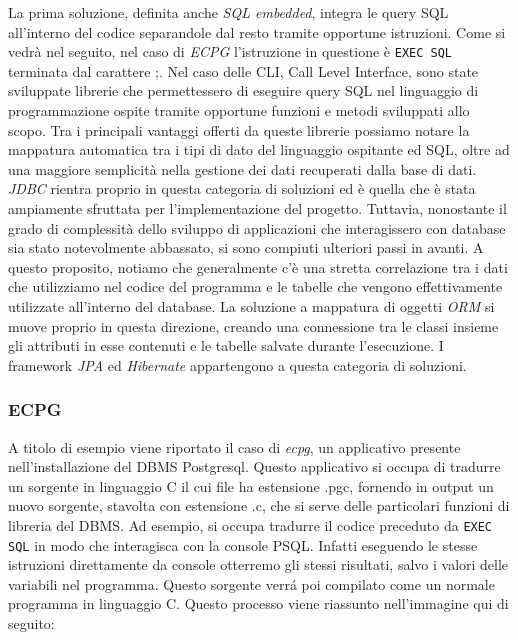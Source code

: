 \documentclass[12pt,a4paper,onecolumn,x11names]{article}
\begin{document}
		\begin{flushleft}
			La prima soluzione, definita anche \textit{SQL embedded}, integra le query SQL all'interno del codice separandole dal resto tramite opportune istruzioni. Come si vedrà nel seguito, nel caso di \textit{ECPG} l'istruzione in questione è \texttt{EXEC SQL} terminata dal carattere ;.\newline
			Nel caso delle CLI, Call Level Interface, sono state sviluppate librerie che permettessero di eseguire query SQL nel linguaggio di programmazione ospite tramite opportune funzioni e metodi sviluppati allo scopo. Tra i principali vantaggi offerti da queste librerie possiamo notare la mappatura automatica tra i tipi di dato del linguaggio ospitante ed SQL, oltre ad una maggiore semplicità nella gestione dei dati recuperati dalla base di dati. \textit{JDBC} rientra proprio in questa categoria di soluzioni ed è quella che è stata ampiamente sfruttata per l'implementazione del progetto.\newline
			Tuttavia, nonostante il grado di complessità dello sviluppo di applicazioni che interagissero con database sia stato notevolmente abbassato, si sono compiuti ulteriori passi in avanti. A questo proposito, notiamo che generalmente c'è una stretta correlazione tra i dati che utilizziamo nel codice del programma e le tabelle che vengono effettivamente utilizzate all'interno del database. La soluzione a mappatura di oggetti \textit{ORM} si muove proprio in questa direzione, creando una connessione tra le classi insieme gli attributi in esse contenuti e le tabelle salvate durante l'esecuzione. I framework \textit{JPA} ed \textit{Hibernate} appartengono a questa categoria di soluzioni.
			
			\subsubsection{ECPG}
			A titolo di esempio viene riportato il caso di \textit{ecpg}, un applicativo presente nell'installazione del DBMS Postgresql. Questo applicativo si occupa di tradurre un sorgente in linguaggio C il cui file ha estensione \textsf{.pgc}, fornendo in output un nuovo sorgente, stavolta con estensione \textsf{.c}, che si serve delle particolari funzioni di libreria del DBMS. Ad esempio, si occupa tradurre il codice preceduto da \texttt{EXEC SQL} in modo che interagisca con la console PSQL. Infatti eseguendo le stesse istruzioni direttamente da console otterremo gli stessi risultati, salvo i valori delle variabili nel programma.\newline 
			Questo sorgente verr\'{a} poi compilato come un normale programma in linguaggio C. Questo processo viene riassunto nell'immagine qui di seguito:
		

\end{flushleft}
\end{document}

